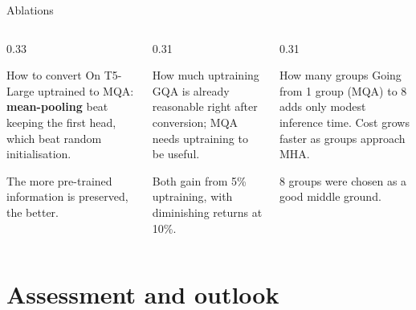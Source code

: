 \documentclass[aspectratio=169,11pt]{beamer}
\begin{document}
\begin{frame}{Ablations}
  \begin{columns}[T]
    \begin{column}{0.33\textwidth}
      \begin{block}{How to convert}
        \small
        On T5-Large uptrained to MQA:
        \textbf{mean-pooling} beat keeping the first head, which beat random initialisation.
        \vspace{1mm}

        The more pre-trained information is preserved, the better.
      \end{block}
    \end{column}
    \begin{column}{0.31\textwidth}
      \begin{block}{How much uptraining}
        \small
        GQA is already reasonable right after conversion; MQA needs uptraining to be useful.
        \vspace{1mm}

        Both gain from 5\% uptraining, with diminishing returns at 10\%.
      \end{block}
    \end{column}
    \begin{column}{0.31\textwidth}
      \begin{block}{How many groups}
        \small
        Going from 1 group (MQA) to 8 adds only modest inference time. Cost grows faster as groups approach MHA.
        \vspace{1mm}

        8 groups were chosen as a good middle ground.
      \end{block}
    \end{column}
  \end{columns}
\end{frame}

\section{Assessment and outlook}
\end{document}
